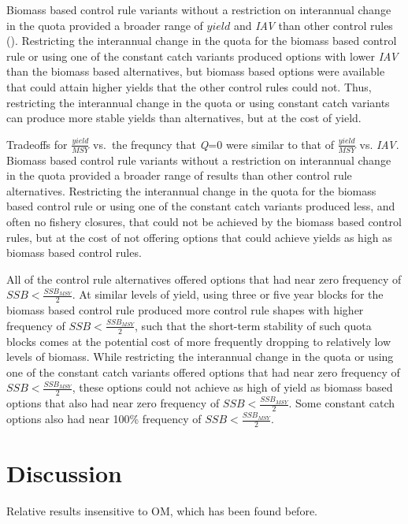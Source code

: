 \documentclass[]{article}
\begin{document}
Biomass based control rule variants without a restriction on interannual
change in the quota provided a broader range of \(yield\) and \emph{IAV}
than other control rules (). Restricting the interannual change in the
quota for the biomass based control rule or using one of the constant
catch variants produced options with lower \emph{IAV} than the biomass
based alternatives, but biomass based options were available that could
attain higher yields that the other control rules could not. Thus,
restricting the interannual change in the quota or using constant catch
variants can produce more stable yields than alternatives, but at the
cost of yield.

Tradeoffs for \(\frac{yield}{MSY}\) vs.~the frequncy that \emph{Q}=0
were similar to that of \(\frac{yield}{MSY}\) vs. \emph{IAV}. Biomass
based control rule variants without a restriction on interannual change
in the quota provided a broader range of results than other control rule
alternatives. Restricting the interannual change in the quota for the
biomass based control rule or using one of the constant catch variants
produced less, and often no fishery closures, that could not be achieved
by the biomass based control rules, but at the cost of not offering
options that could achieve yields as high as biomass based control
rules.

All of the control rule alternatives offered options that had near zero
frequency of \(SSB < \frac{SSB_{MSY}}{2}\). At similar levels of yield,
using three or five year blocks for the biomass based control rule
produced more control rule shapes with higher frequency of
\(SSB < \frac{SSB_{MSY}}{2}\), such that the short-term stability of
such quota blocks comes at the potential cost of more frequently
dropping to relatively low levels of biomass. While restricting the
interannual change in the quota or using one of the constant catch
variants offered options that had near zero frequency of
\(SSB <\frac{SSB_{MSY}}{2}\), these options could not achieve as high of
yield as biomass based options that also had near zero frequency of
\(SSB <\frac{SSB_{MSY}}{2}\). Some constant catch options also had near
100\% frequency of \(SSB <\frac{SSB_{MSY}}{2}\).

\section{Discussion}\label{discussion}

Relative results insensitive to OM, which has been found before.
\end{document}
